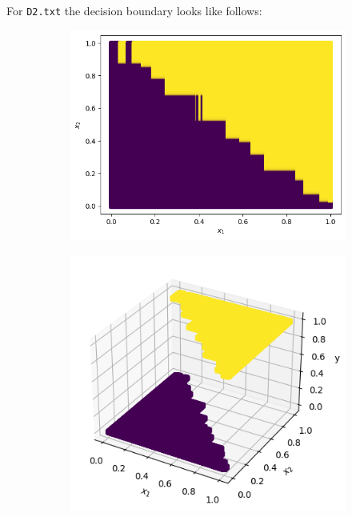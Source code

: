\documentclass[a4paper]{article}
\theoremstyle{definition}
\newenvironment{soln}{
    \leavevmode\color{blue}\ignorespaces
}{}
\begin{document}
\begin{enumerate}
\begin{itemize}
\begin{soln}
\begin{figure}[H]
\begin{subfigure}{0.5\textwidth}
            \end{subfigure}
            \label{fig:q6_d1_bound}
        \end{figure}
      For \texttt{D2.txt} the decision boundary looks like follows:
        \begin{figure}[H]
            \begin{subfigure}{0.5\textwidth}
                \centering
                \includegraphics[scale=0.3]{Images/Q6/DTq6d2_bound.png}
            \end{subfigure}%
            \begin{subfigure}{0.5\textwidth}
                \centering
                \includegraphics[scale=0.3]{Images/Q6/DTq6d2_bound_3d.png}
            \end{subfigure}
            \label{fig:q6_d2_bound}
        \end{figure}
  \end{soln}


\end{itemize}
\end{enumerate}
\end{document}
